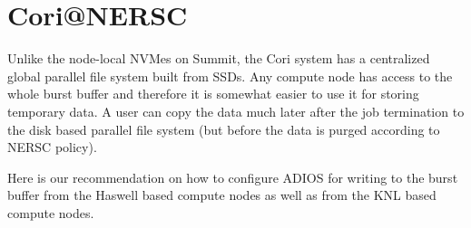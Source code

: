 \section{Cori@NERSC}

Unlike the node-local NVMes on Summit, the Cori system has a centralized global parallel file system built from SSDs. Any compute node has access to the whole burst buffer and therefore it is somewhat easier to use it for storing temporary data. A user can copy the data much later after the job termination to the disk based parallel file system (but before the data is purged according to NERSC policy).

Here is our recommendation on how to configure ADIOS for writing to the burst buffer from the Haswell based compute nodes as well as from the KNL based compute nodes.





